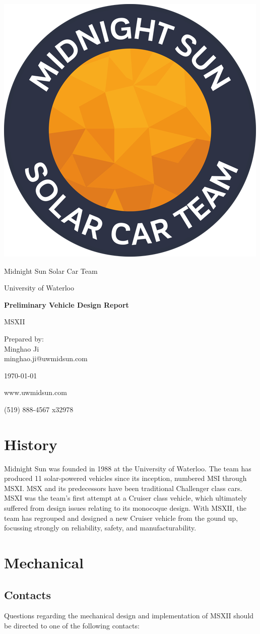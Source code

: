 \documentclass[10pt]{article}
\newcommand\thetitle{Preliminary Vehicle Design Report}
\newcommand\theauthor{Midnight Sun Solar Car Team}
\newcommand\thedate{\today}
\begin{document}
\begin{titlepage}
	\vspace*{2cm}
	\centering
	\includegraphics[width=.25\textwidth]{./figures/midnightSunLogoCircle.png}\par
	\vspace{1.5cm}
	{\LARGE \theauthor \par}
	{\large University of Waterloo\par}
	\vspace{2.2cm}
	{\huge\bfseries \thetitle\par} 
	\vspace{0.2cm}
	\large MSXII %
	\vspace{2.2cm}	
	\par Prepared by:\\
	Minghao Ji\\
	minghao.ji@uwmidsun.com\par
	\thedate\par
	\vfill
	www.uwmidsun.com \par
	(519) 888-4567 x32978
\end{titlepage}

\tableofcontents
\listoffigures
\listoftables

\section{History}
Midnight Sun was founded in 1988 at the University of Waterloo. The team has produced 11 solar-powered vehicles since its inception, numbered MSI through MSXI. MSX and its predecessors have been traditional Challenger class cars. MSXI was the team's first attempt at a Cruiser class vehicle, which ultimately suffered from design issues relating to its monocoque design. With MSXII, the team has regrouped and designed a new Cruiser vehicle from the gound up, focussing strongly on reliability, safety, and manufacturability.

\section{Mechanical}
\subsection{Contacts}
Questions regarding the mechanical design and implementation of MSXII should be directed to one of the following contacts:
\end{document}
